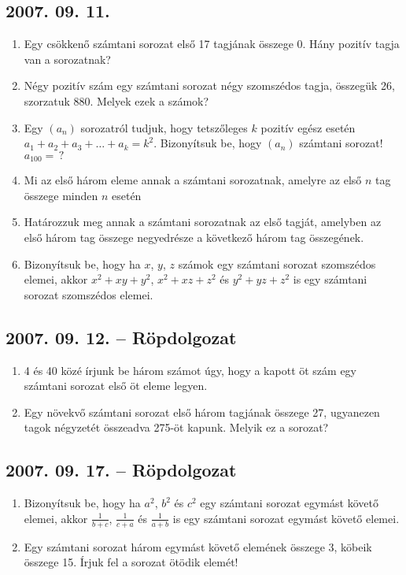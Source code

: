 \subsection*{2007. 09. 11.}
\begin{enumerate}
\item Egy csökkenő számtani sorozat első 17 tagjának összege 0. Hány pozitív tagja van a sorozatnak?
\item Négy pozitív szám egy számtani sorozat négy szomszédos tagja, összegük 26, szorzatuk 880.
Melyek ezek a számok? 
\item Egy $(a_n)$ sorozatról tudjuk, hogy tetszőleges $k$ pozitív egész esetén $a_1+a_2+a_3+\ldots+a_k=k^2$. Bizonyítsuk be, hogy $(a_n)$ számtani sorozat! $a_{100}=\,?$
\item Mi az első három eleme annak a számtani sorozatnak, amelyre az első $n$ tag összege minden $n$ esetén
\item Határozzuk meg annak a számtani sorozatnak az első tagját,
amelyben az első három tag összege negyed\-része a következő három tag összegének. 
\item Bizonyítsuk be, hogy ha $x$, $y$, $z$ számok egy számtani sorozat szomszédos elemei,
akkor $x^2+xy+y^2$, $x^2+xz+z^2$ és  $y^2+yz+z^2$ is egy számtani sorozat szomszédos elemei.
\end{enumerate}


\subsection*{2007. 09. 12. -- Röpdolgozat}
\begin{enumerate}
\item 4 és 40 közé írjunk be három számot úgy, hogy a kapott öt szám egy számtani sorozat első öt eleme legyen.
\item Egy növekvő számtani sorozat első három tagjának összege 27, ugyanezen tagok négyzetét összeadva 275-öt kapunk. Melyik ez a sorozat?
\end{enumerate}

\subsection*{2007. 09. 17. -- Röpdolgozat}
\begin{enumerate}
\item Bizonyítsuk be, hogy ha $a^2$, $b^2$ és $c^2$ egy számtani sorozat egymást követő elemei, 
akkor $\displaystyle{\frac{1}{b+c}}$, 
$\displaystyle{\frac{1}{c+a}}$ és
$\displaystyle{\frac{1}{a+b}}$ is egy számtani sorozat egymást követő elemei.
\item Egy számtani sorozat három egymást követő elemének összege 3, köbeik összege 15. Írjuk fel a sorozat ötödik elemét!
\end{enumerate}


